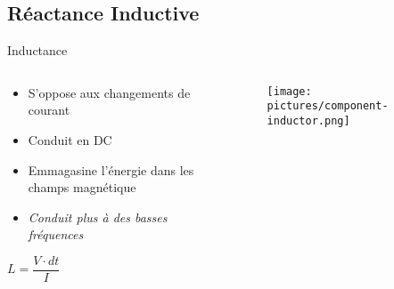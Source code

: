 \subsection{Réactance Inductive}
\begin{frame}{Inductance}
    \begin{columns}
        \begin{column}{0.66\textwidth}
            \begin{itemize}
                \item S'oppose aux changements de courant
                \item Conduit en DC
                \item Emmagasine l'énergie dans les champs magnétique
                \item \textit{Conduit plus à des basses fréquences}
            \end{itemize}
            \par
            \begin{center}
                \Large{$L = \dfrac{V \cdot dt}{I}$}
            \end{center}
        \end{column}
        \begin{column}{0.33\textwidth}
            \begin{figure}
                \centering
                \texttt{[image: pictures/component-inductor.png]}
            \end{figure}
        \end{column}
    \end{columns}
\end{frame}

